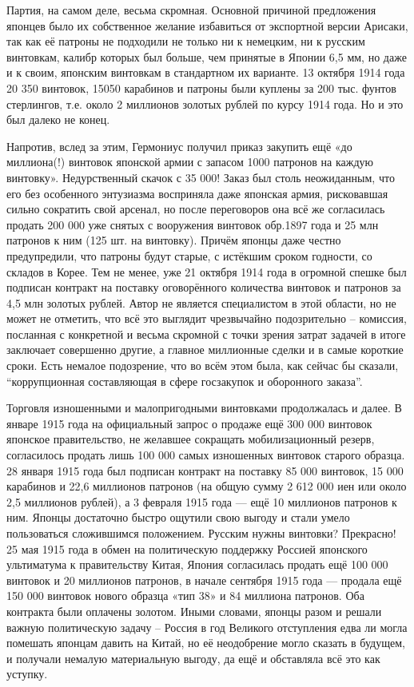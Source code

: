 Партия, на самом деле, весьма скромная. Основной причиной предложения японцев было их собственное желание избавиться от экспортной версии Арисаки, так как её патроны не подходили не только ни к немецким, ни к русским винтовкам, калибр которых был больше, чем принятые в Японии 6,5 мм, но даже и к своим, японским винтовкам в стандартном их варианте. 13 октября 1914 года 20 350 винтовок, 15050 карабинов и патроны были куплены за 200 тыс. фунтов стерлингов, т.е. около 2 миллионов золотых рублей по курсу 1914 года. Но и это был далеко не конец.

Напротив, вслед за этим, Гермониус получил приказ закупить ещё «до миллиона(!) винтовок японской армии с запасом 1000 патронов на каждую винтовку». Недурственный скачок с 35 000! Заказ был столь неожиданным, что его без особенного энтузиазма восприняла даже японская армия, рисковавшая сильно сократить свой арсенал, но после переговоров она всё же согласилась продать 200 000 уже снятых с вооружения винтовок обр.1897 года и 25 млн патронов к ним (125 шт. на винтовку). Причём японцы даже честно предупредили, что патроны будут старые, с истёкшим сроком годности, со складов в Корее. Тем не менее, уже 21 октября 1914 года в огромной спешке был подписан контракт на поставку оговорённого количества винтовок и патронов за 4,5 млн золотых рублей. Автор не является специалистом в этой области, но не может не отметить, что всё это выглядит чрезвычайно подозрительно – комиссия, посланная с конкретной и весьма скромной с точки зрения затрат задачей в итоге заключает совершенно другие, а главное миллионные сделки и в самые короткие сроки. Есть немалое подозрение, что во всём этом была, как сейчас бы сказали, “коррупционная составляющая в сфере госзакупок и оборонного заказа”.

Торговля изношенными и малопригодными винтовками продолжалась и далее. В январе 1915 года на официальный запрос о продаже ещё 300 000 винтовок японское правительство, не желавшее сокращать мобилизационный резерв, согласилось продать лишь 100 000 самых изношенных винтовок старого образца. 28 января 1915 года был подписан контракт на поставку 85 000 винтовок, 15 000 карабинов и 22,6 миллионов патронов (на общую сумму 2 612 000 иен или около 2,5 миллионов рублей), а 3 февраля 1915 года — ещё 10 миллионов патронов к ним. Японцы достаточно быстро ощутили свою выгоду и стали умело пользоваться сложившимся положением. Русским нужны винтовки? Прекрасно! 25 мая 1915 года в обмен на политическую поддержку Россией японского ультиматума к правительству Китая, Япония согласилась продать ещё 100 000 винтовок и 20 миллионов патронов, в начале сентября 1915 года — продала ещё 150 000 винтовок нового образца «тип 38» и 84 миллиона патронов. Оба контракта были оплачены золотом. Иными словами, японцы разом и решали важную политическую задачу – Россия в год Великого отступления едва ли могла помешать японцам давить на Китай, но её неодобрение могло сказать в будущем, и получали немалую материальную выгоду, да ещё и обставляла всё это как уступку.

